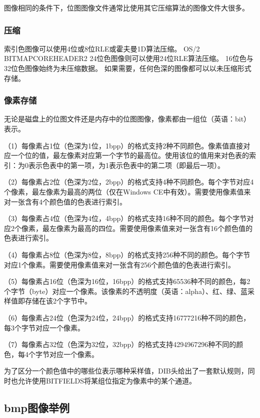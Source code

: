 \documentclass[UTF8]{ctexart}
\begin{document}
图像相同的条件下，位图图像文件通常比使用其它压缩算法的图像文件大很多。

\subsubsection{压缩}

索引色图像可以使用4位或8位RLE或霍夫曼1D算法压缩。
OS/2 BITMAPCOREHEADER2 24位色图像则可以使用24位RLE算法压缩。
16位色与32位色图像始终为未压缩数据。
如果需要，任何色深的图像都可以以未压缩形式存储。

\subsubsection{像素存储}

无论是磁盘上的位图文件还是内存中的位图图像，像素都由一组位（英语：bit）表示。

（1）每像素占1位（色深为1位，1bpp）的格式支持2种不同颜色。像素值直接对应一个位的值，最左像素对应第一个字节的最高位。使用该位的值用来对色表的索引：为0表示色表中的第一项，为1表示色表中的第二项（即最后一项）。

（2）每像素占2位（色深为2位，2bpp）的格式支持4种不同颜色。每个字节对应4个像素，最左像素为最高的两位（仅在Windows CE中有效）。需要使用像素值来对一张含有4个颜色值的色表进行索引。

（3）每像素占4位（色深为4位，4bpp）的格式支持16种不同的颜色。每个字节对应2个像素，最左像素为最高的四位。需要使用像素值来对一张含有16个颜色值的色表进行索引。

（4）每像素占8位（色深为8位，8bpp）的格式支持256种不同的颜色。每个字节对应1个像素。需要使用像素值来对一张含有256个颜色值的色表进行索引。

（5）每像素占16位（色深为16位，16bpp）的格式支持65536种不同的颜色，每2个字节（byte）对应一个像素。该像素的不透明度（英语：alpha）、红、绿、蓝采样值即存储在该2个字节中。

（6）每像素占24位（色深为24位，24bpp）的格式支持16777216种不同的颜色，每3个字节对应一个像素。

（7）每像素占32位（色深为32位，32bpp）的格式支持4294967296种不同的颜色，每4个字节对应一个像素。

为了区分一个颜色值中的哪些位表示哪种采样值，DIB头给出了一套默认规则，同时也允许使用BITFIELDS将某组位指定为像素中的某个通道。

\subsection{bmp图像举例}
\end{document}
